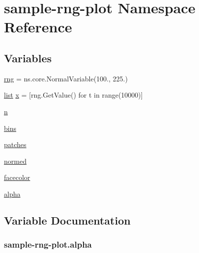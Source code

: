 \hypertarget{namespacesample-rng-plot}{}\section{sample-\/rng-\/plot Namespace Reference}
\label{namespacesample-rng-plot}
\subsection*{Variables}
\begin{DoxyCompactItemize}
\item 
\hyperlink{namespacesample-rng-plot_a97a9861d8531a085e4641cd8dc918a97}{rng} = ns.\+core.\+Normal\+Variable(100., 225.)
\item 
\hyperlink{openflow-interface_8h_afd9bcfa176617760671b67580f536fa7}{list} \hyperlink{namespacesample-rng-plot_a5b903688ba4a0e9d00ef4d0aa174b44f}{x} = \mbox{[}rng.\+Get\+Value() for t in range(10000)\mbox{]}
\item 
\hyperlink{namespacesample-rng-plot_aeb5ee5c431e338ef39b7ac5431242e1d}{n}
\item 
\hyperlink{namespacesample-rng-plot_afcecae1e5682ae7aedde08daab921fab}{bins}
\item 
\hyperlink{namespacesample-rng-plot_a63a1f5d8c9682fac00db8975d54d67f4}{patches}
\item 
\hyperlink{namespacesample-rng-plot_a1d39abb5d7087ddfc113c39d598e4c47}{normed}
\item 
\hyperlink{namespacesample-rng-plot_aa920295f7cecf8ca823871e7b106fad0}{facecolor}
\item 
\hyperlink{namespacesample-rng-plot_a2dbe7a25aeb215cb725a5f95b432e53d}{alpha}
\end{DoxyCompactItemize}


\subsection{Variable Documentation}
\subsubsection[{\texorpdfstring{alpha}{alpha}}]{\setlength{\rightskip}{0pt plus 5cm}sample-\/{\bf rng}-\/plot.\+alpha}\hypertarget{namespacesample-rng-plot_a2dbe7a25aeb215cb725a5f95b432e53d}{}\label{namespacesample-rng-plot_a2dbe7a25aeb215cb725a5f95b432e53d}
